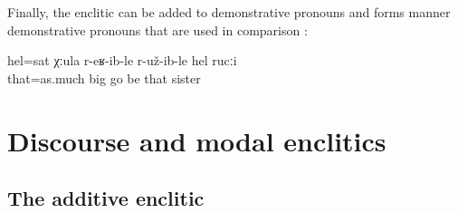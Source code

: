 Finally, the enclitic can be added to demonstrative pronouns and forms manner demonstrative pronouns that are used in comparison :
%
\begin{exe}
	\ex	\label{ex:‎[‎‎From her small finger he pulled out his parents], so big was his sister}
	\gll	hel=sat	χːula	r-eʁ-ib-le	r-už-ib-le	hel	rucːi\\
		that=as.much	big	go	be	that	sister\\
	\glt	{}
\end{exe}




\section{Discourse and modal enclitics}
\label{sec:Discourse and modal enclitics}



\subsection{The additive enclitic}
\label{ssec:The additive enclitic}

